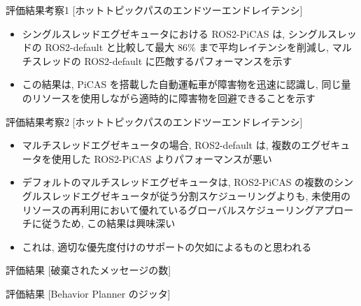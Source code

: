 \begin{frame}{評価結果考察1 [ホットトピックパスのエンドツーエンドレイテンシ]}
    \begin{itemize}
        \item シングルスレッドエグゼキュータにおける ROS2-PiCAS は, シングルスレッドの ROS2-default と比較して最大 $86 \%$ まで平均レイテンシを削減し, マルチスレッドの ROS2-default に匹敵するパフォーマンスを示す
        \item この結果は, PiCAS を搭載した自動運転車が障害物を迅速に認識し, 同じ量のリソースを使用しながら適時的に障害物を回避できることを示す
    \end{itemize}
\end{frame}

\begin{frame}{評価結果考察2 [ホットトピックパスのエンドツーエンドレイテンシ]}
    \begin{itemize}
        \item マルチスレッドエグゼキュータの場合, ROS2-default は, 複数のエグゼキュータを使用した ROS2-PiCAS よりパフォーマンスが悪い
        \item デフォルトのマルチスレッドエグゼキュータは, ROS2-PiCAS の複数のシングルスレッドエグゼキュータが従う分割スケジューリングよりも, 未使用のリソースの再利用において優れているグローバルスケジューリングアプローチに従うため, この結果は興味深い
        \item これは, 適切な優先度付けのサポートの欠如によるものと思われる
    \end{itemize}
\end{frame}

\begin{frame}{評価結果 [破棄されたメッセージの数]}
\end{frame}

\begin{frame}{評価結果 [Behavior Planner のジッタ]}
\end{frame}
